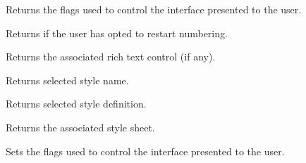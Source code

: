 \label{wxrichtextstyleorganiserdialoggetflags}


Returns the flags used to control the interface presented to the user.

\label{wxrichtextstyleorganiserdialoggetrestartnumbering}


Returns \true if the user has opted to restart numbering.

\label{wxrichtextstyleorganiserdialoggetrichtextctrl}


Returns the associated rich text control (if any).

\label{wxrichtextstyleorganiserdialoggetselectedstyle}


Returns selected style name.

\label{wxrichtextstyleorganiserdialoggetselectedstyledefinition}


Returns selected style definition.

\label{wxrichtextstyleorganiserdialoggetstylesheet}


Returns the associated style sheet.

\label{wxrichtextstyleorganiserdialogsetflags}


Sets the flags used to control the interface presented to the user.

\label{wxrichtextstyleorganiserdialogsetrestartnumbering}


